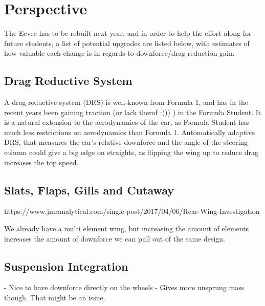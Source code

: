 \chapter*{Perspective}

The Eevee has to be rebuilt next year, and in order to help the effort along for future students, a list of potential upgrades are listed below, with estimates of how valuable each change is in regards to downforce/drag reduction gain.

\section{Drag Reductive System}

A drag reductive system (DRS) is well-known from Formula 1, and has in the recent years been gaining traction (or lack therof :))) ) in the Formula Student. It is a natural extension to the aerodynamics of the car, as Formula Student has much less restrictions on aerodynamics than Formula 1. Automatically adaptive DRS, that measures the car's relative downforce and the angle of the steering column could give a big edge on straights, as flipping the wing up to reduce drag increases the top speed.

\section{Slats, Flaps, Gills and Cutaway}

https://www.jmranalytical.com/single-post/2017/04/06/Rear-Wing-Investigation

We already have a multi element wing, but increasing the amount of elements increases the amount of downforce we can pull out of the same design.

\section{Suspension Integration}

- Nice to have downforce directly on the wheels
- Gives more unsprung mass though. That might be an issue.
